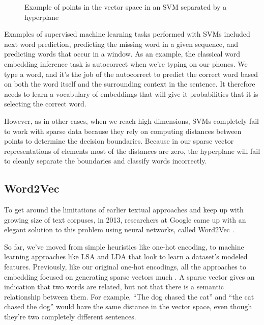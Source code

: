\documentclass[11pt, table]{diazessay} %
\begin{document}
\begin{sloppypar}
\begin{figure}[H]
\caption{Example of points in the vector space in an SVM separated by a hyperplane}
\end{figure}


Examples of supervised machine learning tasks performed with SVMs included next word prediction, predicting the missing word in a given sequence, and predicting words that occur in a window. As an example, the classical word embedding inference task is autocorrect when we're typing on our phones. We type a word, and it's the job of the autocorrect to predict the correct word based on both the word itself and the surrounding context in the sentence. It therefore needs to learn a vocabulary of embeddings that will give it probabilities that it is selecting the correct word.

However, as in other cases, when we reach high dimensions, SVMs completely fail to work with sparse data because they rely on computing distances between points to determine the decision boundaries. Because in our sparse vector representations of elements most of the distances are zero, the hyperplane will fail to cleanly separate the boundaries and classify words incorrectly.

\subsection{Word2Vec}

To get around the limitations of earlier textual approaches and keep up with growing size of text corpuses, in 2013, researchers at Google came up with an elegant solution to this problem using neural networks, called Word2Vec \citep{mikolov2013efficient}.  

So far, we've moved from simple heuristics like one-hot encoding, to machine learning approaches like LSA and LDA that look to learn a dataset's modeled features.  Previously, like our original one-hot encodings, all the approaches to embedding focused on generating sparse vectors much . A sparse vector gives an indication that two words are related, but not that there is a semantic relationship between them. For example, “The dog chased the cat” and “the cat chased the dog” would have the same distance in the vector space, even though they’re two completely different sentences.


\end{sloppypar}
\end{document}
